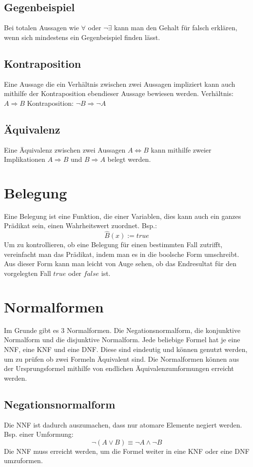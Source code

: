 \documentclass{article}
\begin{document}
\subsection{Gegenbeispiel}
Bei totalen Aussagen wie \(\forall\) oder \(\neg \exists\) kann man den Gehalt für falsch erklären, wenn sich mindestens ein Gegenbeispiel finden lässt.
\subsection{Kontraposition}
Eine Aussage die ein Verhältnis zwischen zwei Aussagen impliziert kann auch mithilfe der Kontraposition ebendieser Aussage bewiesen werden. Verhältnis: \(A \Rightarrow B\) Kontraposition: \(\neg B \Rightarrow \neg A\)
\subsection{Äquivalenz}
Eine Äquivalenz zwischen zwei Aussagen \(A \Leftrightarrow B\) kann mithilfe zweier Implikationen \(A \Rightarrow B\) und \(B \Rightarrow A\) belegt werden.

\section{Belegung}
Eine Belegung ist eine Funktion, die einer Variablen, dies kann auch ein ganzes Prädikat sein, einen Wahrheitswert zuordnet. Bsp.: \[
		\hat{B}(x) := true
\]
Um zu kontrollieren, ob eine Belegung für einen bestimmten Fall zutrifft, vereinfacht man das Prädikat, indem man es in die boolsche Form umschreibt. Aus dieser Form kann man leicht von Auge sehen, ob das Endresultat für den vorgelegten Fall \(true\) oder \(false\) ist.
\section{Normalformen}
Im Grunde gibt es 3 Normalformen. Die Negationsnormalform, die konjunktive Normalform und die disjunktive Normalform. Jede beliebige Formel hat je eine NNF, eine KNF und eine DNF. Diese sind eindeutig und können genutzt werden, um zu prüfen ob zwei Formeln Äquivalent sind. Die Normalformen können aus der Ursprungsformel mithilfe von endlichen Äquivalenzumformungen erreicht werden.
\subsection{Negationsnormalform}
Die NNF ist dadurch auszumachen, dass nur atomare Elemente negiert werden. Bsp. einer Umformung: \[
		\neg(A \lor B) \equiv \neg A \land\neg B
\]
Die NNF muss erreicht werden, um die Formel weiter in eine KNF oder eine DNF umzuformen.
\end{document}
